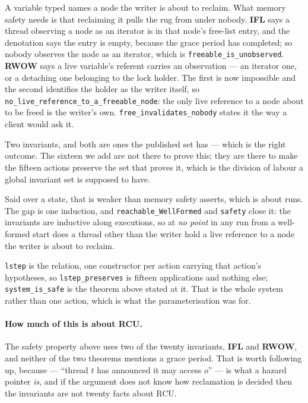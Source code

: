 A variable typed \frbl{} names a node the writer is about to reclaim.  What
memory safety needs is that reclaiming it pulls the rug from under nobody.
\textbf{IFL} says a thread observing a node as an iterator is in that node's
free-list entry, and the \frbl{} denotation says the entry is empty, because the
grace period has completed; so nobody observes the node as an iterator, which is
\texttt{freeable\_is\_unobserved}.  \textbf{RWOW} says a live variable's
referent carries an observation --- an iterator one, or a detaching one
belonging to the lock holder.  The first is now impossible and the second
identifies the holder as the writer itself, so
\texttt{no\_live\_reference\_to\_a\_freeable\_node}: the only live reference to
a node about to be freed is the writer's own.
\texttt{free\_invalidates\_nobody} states it the way a client would ask it.

Two invariants, and both are ones the published set has --- which is the right
outcome.  The sixteen we add are not there to prove this; they are there to make
the fifteen actions preserve the set that proves it, which is the division of
labour a global invariant set is supposed to have.

Said over a state, that is weaker than memory safety asserts, which is about
runs.  The gap is one induction, and \texttt{reachable\_WellFormed} and
\texttt{safety} close it: the invariants are inductive along executions, so at
\emph{no point} in any run from a well-formed start does a thread other than the
writer hold a live reference to a node the writer is about to reclaim.

\texttt{lstep} is the relation, one constructor per action carrying that
action's hypotheses, so \texttt{lstep\_preserves} is fifteen applications and
nothing else; \texttt{system\_is\_safe} is the theorem above stated at it.  That
is the whole system rather than one action, which is what the parameterisation
was for.

\paragraph{How much of this is about RCU.}
The safety property above uses two of the twenty invariants, \textbf{IFL} and
\textbf{RWOW}, and neither of the two theorems mentions a grace period.  That
is worth following up, because \itr{} --- ``thread $t$ has announced it may
access $o$'' --- is what a hazard pointer \emph{is}, and if the argument does
not know how reclamation is decided then the invariants are not twenty facts
about RCU.

